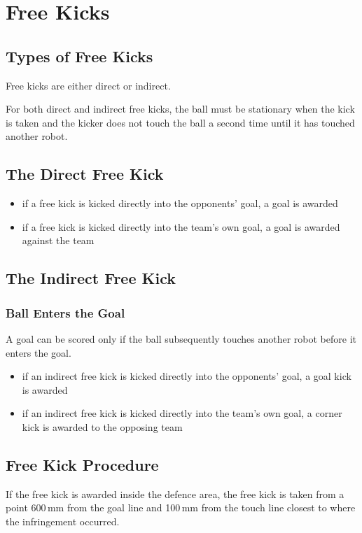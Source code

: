 \section{Free Kicks}\label{sec:free-kicks}

\subsection{Types of Free Kicks}
Free kicks are either direct or indirect.

For both direct and indirect free kicks, the ball must be stationary when the kick is taken and the kicker does not touch the ball a second time until it has touched another robot.

\subsection{The Direct Free Kick}
\begin{itemize}
\item if a free kick is kicked directly into the opponents' goal, a goal is awarded
\item if a free kick is kicked directly into the team's own goal, a goal is awarded against the team
\end{itemize}

\subsection{The Indirect Free Kick}
\subsubsection{Ball Enters the Goal}
A goal can be scored only if the ball subsequently touches another robot before it enters the goal.

\begin{itemize}
\item if an indirect free kick is kicked directly into the opponents' goal, a goal kick is awarded
\item if an indirect free kick is kicked directly into the team's own goal, a corner kick is awarded to the opposing team
\end{itemize}

\subsection{Free Kick Procedure}
If the free kick is awarded inside the defence area, the free kick is taken from a point 600\,mm from the goal line and 100\,mm from the touch line closest to where the infringement occurred.

